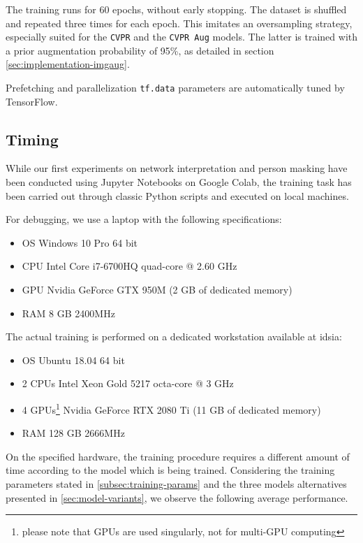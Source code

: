 The training runs for 60 epochs, without early stopping. The dataset is shuffled and repeated three times for each epoch. This imitates an oversampling strategy, especially suited for the \texttt{CVPR} and the \texttt{CVPR Aug} models. The latter is trained with a prior augmentation probability of 95\%, as detailed in section \ref{sec:implementation-imgaug}.

Prefetching and parallelization \texttt{tf.data} parameters are automatically tuned by TensorFlow.



\subsection{Timing}
\label{subsec:training-timing}

While our first experiments on network interpretation and person masking have been conducted using Jupyter Notebooks on Google Colab, the training task has been carried out through classic Python scripts and executed on local machines.

\medskip

For debugging, we use a laptop with the following specifications:
\begin{itemize}
    \item OS Windows 10 Pro 64 bit
    \item CPU Intel Core i7-6700HQ quad-core @ 2.60 GHz
    \item GPU Nvidia GeForce GTX 950M (2 GB of dedicated memory)
    \item RAM 8 GB 2400MHz
\end{itemize}

The actual training is performed on a dedicated workstation available at \gls{idsia}:
\begin{itemize}
    \item OS Ubuntu 18.04 64 bit
    \item 2 CPUs Intel Xeon Gold 5217 octa-core @ 3 GHz
    \item 4 GPUs\footnote{please note that GPUs are used singularly, not for multi-GPU computing} Nvidia GeForce RTX 2080 Ti (11 GB of dedicated memory)
    \item RAM 128 GB 2666MHz
\end{itemize}

\medskip
    
On the specified hardware, the training procedure requires a different amount of time according to the model which is being trained. Considering the training parameters stated in \ref{subsec:training-params} and the three models alternatives presented in \ref{sec:model-variants}, we observe the following average performance.

